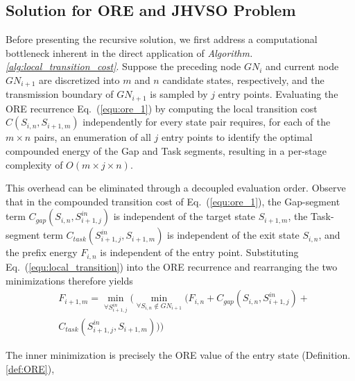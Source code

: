 \subsection{Solution for ORE and JHVSO Problem}

Before presenting the recursive solution, we first address a computational bottleneck inherent in the direct application of \textit{Algorithm. \ref{alg:local_transition_cost}}.
Suppose the preceding node $GN_i$ and current node $GN_{i+1}$ are discretized into $m$ and $n$ candidate states, respectively, and the transmission boundary of $GN_{i+1}$ is sampled by $j$ entry points.
Evaluating the ORE recurrence Eq.~(\ref{equ:ore_1}) by computing the local transition cost $C(S_{i,n},S_{i+1,m})$ independently for every state pair requires, for each of the $m\times n$  pairs, an enumeration of all $j$  entry points to identify the optimal compounded energy of the Gap and Task segments, resulting in a per-stage complexity of $O(m\times j \times n)$.

This overhead can be eliminated through a decoupled evaluation order.
Observe that in the compounded transition cost of Eq.~(\ref{equ:ore_1}), the Gap-segment term $C_{gap}(S_{i,n},S^{in}_{i+1,j})$ is independent of the target state $S_{i+1,m}$, the Task-segment term $C_{task}(S^{in}_{i+1,j},S_{i+1,m})$ is independent of the exit state $S_{i,n}$, and the prefix energy $F_{i,n}$ is independent of the entry point.
Substituting Eq.~(\ref{equ:local_transition}) into the ORE recurrence and rearranging the two minimizations therefore yields
\begin{align}\label{equ}
    &F_{i+1,m} = \min_{\forall S^{in}_{i+1,j}}(\min_{\forall S_{i,n} \notin GN_{i+1}}(F_{i,n} + C_{gap}(S_{i,n},S^{in}_{i+1,j}) + 
    \nonumber
    \\ &C_{task}(S^{in}_{i+1,j},S_{i+1,m})))
\end{align}

The inner minimization is precisely the ORE value of the entry state (Definition. \ref{def:ORE}),

